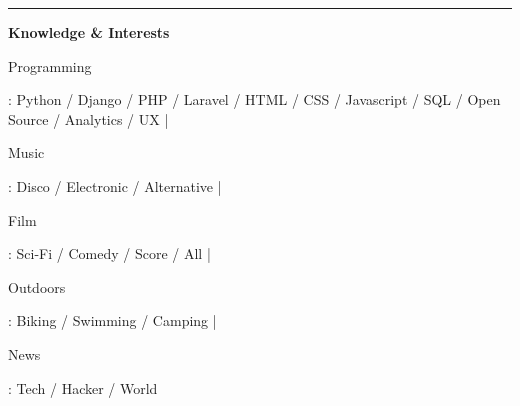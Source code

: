 \documentclass[11pt]{article}
\begin{document}
\hrule
\vspace{0.6em}
\begin{LARGE}
\bf Knowledge \& Interests
\end{LARGE}

\vspace{0.3em}

\begin{bf}Programming\end{bf}: Python / Django / PHP / Laravel / HTML / CSS / Javascript / SQL / Open Source / Analytics / UX | \begin{bf}Music\end{bf}: Disco / Electronic / Alternative | \begin{bf}Film\end{bf}: Sci-Fi / Comedy / Score / All | \begin{bf}Outdoors\end{bf}: Biking / Swimming / Camping | \begin{bf}News\end{bf}: Tech / Hacker / World
\end{document}
